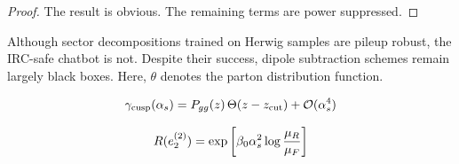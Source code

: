 \begin{proof}
The result is obvious. The remaining terms are power suppressed.
\end{proof}

Although sector decompositions trained on Herwig samples are pileup
robust, the IRC-safe chatbot is not. Despite their success, dipole
subtraction schemes remain largely black boxes. Here, $\theta$ denotes
the parton distribution function.

\begin{equation}
  \gamma_{\rm cusp}(\alpha_s) = P_{gg}(z) \, \Theta(z - z_{\rm cut}) + \mathcal{O}(\alpha_s^{4})
  \label{eq:2}
\end{equation}

\begin{equation}
  R(e_2^{(2)}) = \exp\left[\beta_0 \alpha_s^2 \log\frac{\mu_R}{\mu_F}\right]
  \label{eq:4}
\end{equation}

